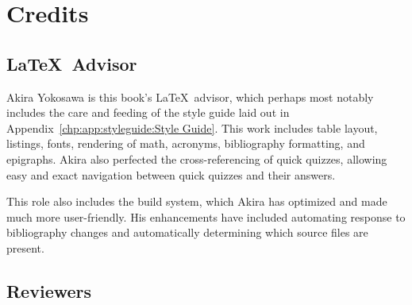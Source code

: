 
\chapter{Credits}
\label{app:ack:Credits}
%



\section{\LaTeX\ Advisor}

Akira Yokosawa is this book's \LaTeX\ advisor, which perhaps most
notably includes the care and feeding of the style guide laid out
in Appendix~\ref{chp:app:styleguide:Style Guide}.
This work includes table layout, listings, fonts, rendering of math,
acronyms, bibliography formatting, and epigraphs.
Akira also perfected the cross-referencing of quick quizzes, allowing
easy and exact navigation between quick quizzes and their answers.

This role also includes the build system, which Akira has optimized and
made much more user-friendly.
His enhancements have included automating response to bibliography
changes and automatically determining which source files are present.

\section{Reviewers}

